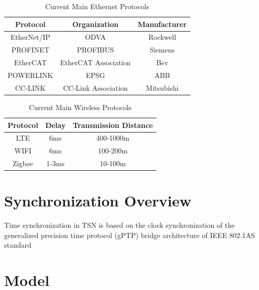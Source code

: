 \documentclass[english]{cccconf}
\begin{document}
\begin{table}[htbp]
	\caption{Current Main Ethernet Protocols}
	\begin{center}
		\begin{tabular}{|c|c|c|}
			\hline
			\textbf{Protocol}& \textbf{Organization}& \textbf{Manufacturer} \\
			\hline
			EtherNet/IP
			& ODVA
			& Rockwell \\
			\hline
			PROFINET
			& PROFIBUS
			& Siemens \\
			\hline
			EtherCAT
			& EtherCAT Association
			& Bev \\
			\hline
			POWERLINK
			& EPSG
			& ABB \\
			\hline
			CC-LINK
			& CC-Link Association
			& Mitsubishi \\
			\hline 						
		\end{tabular}
		\label{tab1}
	\end{center}
\end{table}

\begin{table}[htbp]
	\caption{Current Main Wireless Protocols}
	\begin{center}
		\begin{tabular}{|c|c|c|}
			\hline
			\textbf{Protocol}& \textbf{Delay}& \textbf{Transmission Distance} \\
			\hline
			LTE
			& 6ms
			& 400-1000m \\
			\hline
			WIFI
			& 6ms
			& 100-200m \\
			\hline
			Zigbee
			& 1-3ms
			& 10-100m \\
			\hline		
		\end{tabular}
		\label{tab1}
	\end{center}
\end{table}

\section{Synchronization Overview}
Time synchronization in TSN is based on the clock synchronization of the generalized precision time protocol (gPTP) bridge architecture of IEEE 802.1AS standard
\section{Model}
\end{document}
